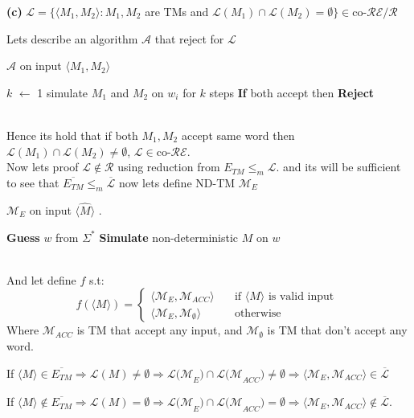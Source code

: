 \documentclass[12pt]{article}
\begin{document}
\hrulefill
\begin{center}
\textbf{(c)} $\mathcal{L} = \{\langle M_1,M_2\rangle : M_1,M_2 $ are TMs and $\mathcal{L}(M_1)\cap \mathcal{L}(M_2)=\emptyset\} \in\text{co-}  \mathcal{RE/R}$
\end{center}
Lets describe an algorithm $\mathcal{A}$ that reject for $\mathcal{L}$
\begin{algorithm}
\caption{  $\mathcal{A}$ on input $\langle M_1,M_2\rangle$ }\label{alg:cap}
\begin{algorithmic}
\State $k$ $\leftarrow$ 1
\State  simulate $M_1$ and $M_2$ on $w_i$
for $k$ steps
\State \textbf{If}{ both accept} then \textbf{Reject}
\EndFor
\EndWhile
\end{algorithmic}
\end{algorithm}
\\Hence its hold that if both $M_1,M_2$ accept same word then $\mathcal{L}(M_1)\cap \mathcal{L}(M_2)\neq\emptyset
$, $\mathcal{L} \in\text{co-}  \mathcal{RE}$.
\\Now  lets proof $\mathcal{L}\notin \mathcal{R}$ using reduction from $E_{TM}\leq_m \mathcal{L}$. and its will be sufficient to see that $\overline{E_{TM}}\leq_m \overline{\mathcal{L}}$ now lets define ND-TM $\mathcal{M}_{E}$\pagebreak
\begin{algorithm}
\caption{ $\mathcal{M}_{E}$ on input $\langle \hat{M}\rangle$ .}\label{alg:cap}
\begin{algorithmic} 
\State \textbf{Guess} $w$ from $\Sigma^*$
\State \textbf{Simulate} non-deterministic $M$ on $w$ 
\end{algorithmic}
\end{algorithm}\\
And let define $f$
s.t:\[
f(\langle M\rangle)=\begin{cases} 
     \langle \mathcal{M}_{E},\mathcal{M}_{ACC} \rangle  &\quad\text{if  }\langle M\rangle \text{ is valid input } \\
    \langle \mathcal{M}_{E},\mathcal{M}_{\emptyset}  \rangle  &\quad\text{otherwise  } \end{cases} 
\]
Where $\mathcal{M}_{ACC}$ is TM that accept any input, and $\mathcal{M}_{\emptyset}$ is TM that don't accept any word. 
\begin{list}{•}{}
\item If $\langle M\rangle \in \overline{ E_{TM}}\Rightarrow \mathcal{L}(M)\neq \emptyset\Rightarrow \mathcal{L(M}_{E})\cap \mathcal{L(M}_{ACC})\neq\emptyset \Rightarrow  \langle \mathcal{M}_{E},\mathcal{M}_{ACC} \rangle \in \overline{\mathcal{L}}$
\item If $\langle M\rangle \notin \overline{ E_{TM}}\Rightarrow \mathcal{L}(M)= \emptyset\Rightarrow \mathcal{L(M}_{E})\cap \mathcal{L(M}_{ACC})=\emptyset \Rightarrow  \langle \mathcal{M}_{E},\mathcal{M}_{ACC} \rangle \notin \overline{\mathcal{L}}$.
\end{list}
\end{document}
